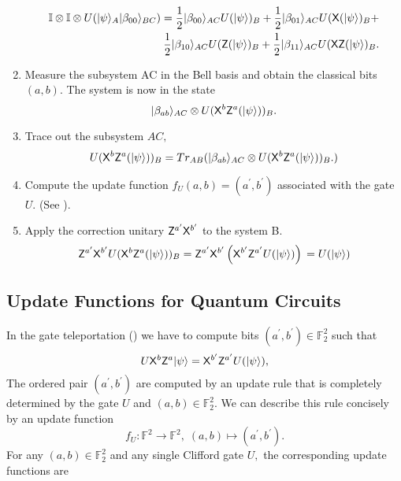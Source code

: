 \begin{definition}
\begin{algorithm}[]
\begin{enumerate}
\begin{equation*}
 \begin{aligned}
\mathbb{I}\otimes \mathbb{I} \otimes U({\lvert}\psi\rangle_A {\lvert}\beta_{00}\rangle_{BC})=\frac{1}{2}{\lvert}\beta_{00}\rangle_{AC} U({\lvert}\psi\rangle)_{B}+ \frac{1}{2}{\lvert}\beta_{01}\rangle_{AC}U( {\sf X}( {\lvert}\psi\rangle)_{B} +\\ \frac{1}{2}{\lvert}\beta_{10}\rangle_{AC}U( {\sf Z}( {\lvert}\psi\rangle)_{B}+ \frac{1}{2}{\lvert}\beta_{11}\rangle_{AC}U( {\sf X} {\sf Z}( {\lvert}\psi\rangle)_{B}.
\end{aligned}
 \end{equation*}
 \item Measure the subsystem AC  in the Bell basis and obtain the classical bits $(a,b).$ The system is now in the state
 \begin{equation}
  \label{eq:telepprtation3}
							{\lvert}\beta_{ab}\rangle_{AC}\otimes U( {\sf X}^b {\sf Z}^a( {\lvert}\psi\rangle))_B.
\end{equation}
\item Trace out the subsystem $AC,$
 \begin{equation}
  \label{eq:telepprtation5}
U( {\sf X}^b {\sf Z}^a( {\lvert}\psi\rangle))_B=Tr_{AB}({\lvert}\beta_{ab}\rangle_{AC}\otimes U( {\sf X}^b {\sf Z}^a( {\lvert}\psi\rangle))_B.)
 \end{equation}
\item Compute the update function $f_U(a,b)=(a^\prime,b^\prime)$ associated with the gate $U.$ (See ).
\item Apply the correction unitary ${\sf Z}^{a^\prime}  {\sf X}^{b^\prime}$ to the system B.
 \begin{equation}
  \label{eq:telepprtation5}
  {\sf Z}^{a^\prime}  {\sf X}^{b^\prime} U( {\sf X}^b {\sf Z}^a( {\lvert}\psi\rangle))_B={\sf Z}^{a^\prime}  {\sf X}^{b^\prime} \left({\sf X}^{b^\prime} {\sf Z}^{a^\prime} U( {\lvert}\psi\rangle)\right)\\
  =U( {\lvert}\psi\rangle)
   \end{equation}
\end{enumerate}	
\end{algorithm}	

\subsection{Update Functions for Quantum Circuits}
\label{update function}
In the gate teleportation () we have to compute bits $(a^\prime, b^\prime)\in\mathbb{F}_2^2$ such that
\begin{equation*}
U{\sf X}^b{\sf Z}^a {\lvert}\psi\rangle={\sf X}^{b^\prime}{\sf Z}^{a^\prime}U({\lvert}\psi\rangle),
\end{equation*}
The ordered pair $(a^\prime, b^\prime)$ are computed by an update rule that is completely determined by the gate $U$ and $(a,b)\in\mathbb{F}_2^2.$ We can describe this rule concisely by an update function
\begin{equation*}
f_U:\mathbb{F}^2\rightarrow \mathbb{F}^2, \; (a,b)\mapsto (a^\prime,b^\prime).
\end{equation*}
For any $(a,b)\in\mathbb{F}_2^2$ and any single Clifford gate $U,$ the corresponding update functions are


\end{definition}
